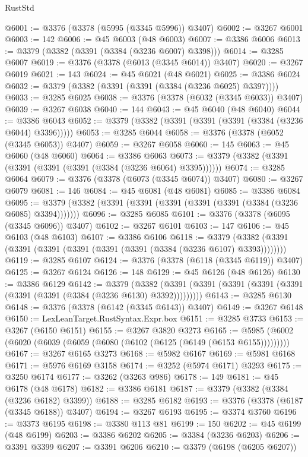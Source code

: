 \begin{lexlean}{RustStd}
\begin{coremodule}
{\begin{coremodule}
{{{{{{{{{{{{{{{{{{{{{{{{{{{{{{{{{{{{{{{@6001 := @3376 (@3378 (@5995 (@3345 @5996)) @3407)
@6002 := @3267 @6001
@6003 := 142
@6006 := @45 @6003 (@48 @6003)
@6007 := @3386 @6006
@6013 := @3379 (@3382 (@3391 (@3384 (@3236 @6007) @3398)))
@6014 := @3285 @6007
@6019 := @3376 (@3378 (@6013 (@3345 @6014)) @3407)
@6020 := @3267 @6019
@6021 := 143
@6024 := @45 @6021 (@48 @6021)
@6025 := @3386 @6024
@6032 := @3379 (@3382 (@3391 (@3391 (@3384 (@3236 @6025) @3397))))
@6033 := @3285 @6025
@6038 := @3376 (@3378 (@6032 (@3345 @6033)) @3407)
@6039 := @3267 @6038
@6040 := 144
@6043 := @45 @6040 (@48 @6040)
@6044 := @3386 @6043
@6052 := @3379 (@3382 (@3391 (@3391 (@3391 (@3384 (@3236 @6044) @3396)))))
@6053 := @3285 @6044
@6058 := @3376 (@3378 (@6052 (@3345 @6053)) @3407)
@6059 := @3267 @6058
@6060 := 145
@6063 := @45 @6060 (@48 @6060)
@6064 := @3386 @6063
@6073 := @3379 (@3382 (@3391 (@3391 (@3391 (@3391 (@3384 (@3236 @6064) @3395))))))
@6074 := @3285 @6064
@6079 := @3376 (@3378 (@6073 (@3345 @6074)) @3407)
@6080 := @3267 @6079
@6081 := 146
@6084 := @45 @6081 (@48 @6081)
@6085 := @3386 @6084
@6095 := @3379 (@3382 (@3391 (@3391 (@3391 (@3391 (@3391 (@3384 (@3236 @6085) @3394)))))))
@6096 := @3285 @6085
@6101 := @3376 (@3378 (@6095 (@3345 @6096)) @3407)
@6102 := @3267 @6101
@6103 := 147
@6106 := @45 @6103 (@48 @6103)
@6107 := @3386 @6106
@6118 := @3379 (@3382 (@3391 (@3391 (@3391 (@3391 (@3391 (@3391 (@3384 (@3236 @6107) @3393))))))))
@6119 := @3285 @6107
@6124 := @3376 (@3378 (@6118 (@3345 @6119)) @3407)
@6125 := @3267 @6124
@6126 := 148
@6129 := @45 @6126 (@48 @6126)
@6130 := @3386 @6129
@6142 := @3379
    (@3382 (@3391 (@3391 (@3391 (@3391 (@3391 (@3391 (@3391 (@3384 (@3236 @6130) @3392)))))))))
@6143 := @3285 @6130
@6148 := @3376 (@3378 (@6142 (@3345 @6143)) @3407)
@6149 := @3267 @6148
@6150 := LexLeanTarget.RustSyntax.Expr.box
@6151 := @3285 @3733
@6153 := @3267 (@6150 @6151)
@6155 := @3267 @3820 @3273
@6165 := @5985 (@6002 (@6020 (@6039 (@6059 (@6080 (@6102 (@6125 (@6149 (@6153 @6155)))))))))
@6167 := @3267 @6165 @3273
@6168 := @5982 @6167
@6169 := @5981 @6168
@6171 := @5976 @6169 @3158
@6174 := @3252 (@5974 @6171) @3293
@6175 := @3250 @6174
@6177 := @3262 (@3263 @986)
@6178 := 149
@6181 := @45 @6178 (@48 @6178)
@6182 := @3386 @6181
@6187 := @3379 (@3382 (@3384 (@3236 @6182) @3399))
@6188 := @3285 @6182
@6193 := @3376 (@3378 (@6187 (@3345 @6188)) @3407)
@6194 := @3267 @6193
@6195 := @3374 @3760
@6196 := @3373 @6195
@6198 := @3380 @113 @81
@6199 := 150
@6202 := @45 @6199 (@48 @6199)
@6203 := @3386 @6202
@6205 := @3384 (@3236 @6203)
@6206 := @3391 @3399
@6207 := @3391 @6206
@6210 := @3379 (@6198 (@6205 @6207))
}}}}}}}}}}}}}}}}}}}}}}}}}}}}}}}}}}}}}}}
\end{coremodule}}
\end{coremodule}
\end{lexlean}
